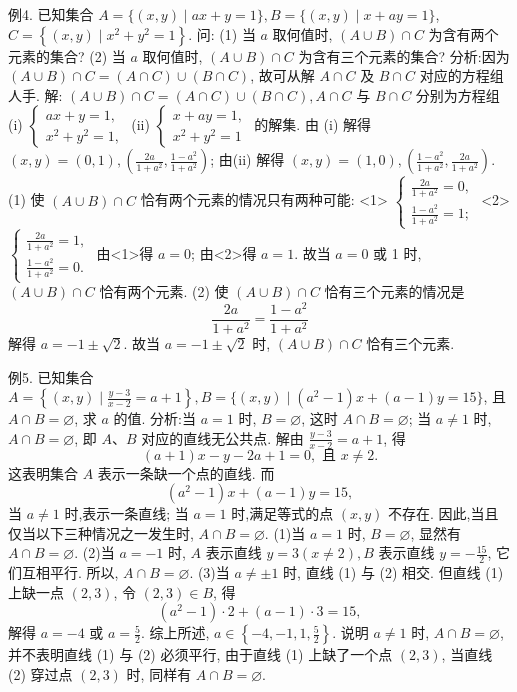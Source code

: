 例4. 已知集合 $A=\{(x, y) \mid a x+y=1\}, B=\{(x, y) \mid x+a y=1\}$, $C=\left\{(x, y) \mid x^2+y^2=1\right\}$. 问:
(1) 当 $a$ 取何值时, $(A \cup B) \cap C$ 为含有两个元素的集合?
(2) 当 $a$ 取何值时, $(A \cup B) \cap C$ 为含有三个元素的集合?
分析:因为 $(A \cup B) \cap C=(A \cap C) \cup(B \cap C)$, 故可从解 $A \cap C$ 及 $B \cap C$ 对应的方程组人手.
解: $(A \cup B) \cap C=(A \cap C) \cup(B \cap C), A \cap C$ 与 $B \cap C$ 分别为方程组
(i) $\left\{\begin{array}{l}a x+y=1, \\ x^2+y^2=1,\end{array}\right.$
(ii) $\left\{\begin{array}{l}x+a y=1, \\ x^2+y^2=1\end{array}\right.$
的解集.
由 (i) 解得 $(x, y)=(0,1),\left(\frac{2 a}{1+a^2}, \frac{1-a^2}{1+a^2}\right)$;
由(ii) 解得 $(x, y)=(1,0),\left(\frac{1-a^2}{1+a^2}, \frac{2 a}{1+a^2}\right)$.
(1) 使 $(A \cup B) \cap C$ 恰有两个元素的情况只有两种可能:
<1> $\left\{\begin{array}{l}\frac{2 a}{1+a^2}=0, \\ \frac{1-a^2}{1+a^2}=1 ;\end{array}\right.$
<2> $\left\{\begin{array}{l}\frac{2 a}{1+a^2}=1, \\ \frac{1-a^2}{1+a^2}=0 .\end{array}\right.$
由<1>得 $a=0$; 由<2>得 $a=1$.
故当 $a=0$ 或 1 时, $(A \cup B) \cap C$ 恰有两个元素.
(2) 使 $(A \cup B) \cap C$ 恰有三个元素的情况是
$$
\frac{2 a}{1+a^2}=\frac{1-a^2}{1+a^2}
$$
解得 $a=-1 \pm \sqrt{2}$.
故当 $a=-1 \pm \sqrt{2}$ 时, $(A \cup B) \cap C$ 恰有三个元素.



例5. 已知集合 $A=\left\{(x, y) \mid \frac{y-3}{x-2}=a+1\right\}, B=\{(x, y) \mid(a^2- 1) x+(a-1) y=15\}$, 且 $A \cap B=\varnothing$, 求 $a$ 的值.
分析:当 $a=1$ 时, $B=\varnothing$, 这时 $A \cap B=\varnothing$; 当 $a \neq 1$ 时, $A \cap B=\varnothing$, 即 $A 、 B$ 对应的直线无公共点.
解由 $\frac{y-3}{x-2}=a+1$, 得
$$
(a+1) x-y-2 a+1=0, \text { 且 } x \neq 2 .
$$
这表明集合 $A$ 表示一条缺一个点的直线.
而
$$
\left(a^2-1\right) x+(a-1) y=15,
$$
当 $a \neq 1$ 时,表示一条直线; 当 $a=1$ 时,满足等式的点 $(x, y)$ 不存在.
因此,当且仅当以下三种情况之一发生时, $A \cap B=\varnothing$.
(1)当 $a=1$ 时, $B=\varnothing$, 显然有 $A \cap B=\varnothing$.
(2)当 $a=-1$ 时, $A$ 表示直线 $y=3(x \neq 2), B$ 表示直线 $y=-\frac{15}{2}$, 它们互相平行.
所以, $A \cap B=\varnothing$.
(3)当 $a \neq \pm 1$ 时, 直线 (1) 与 (2) 相交.
但直线 (1) 上缺一点 $(2,3)$, 令 $(2, 3) \in B$, 得
$$
\left(a^2-1\right) \cdot 2+(a-1) \cdot 3=15,
$$
解得 $a=-4$ 或 $a=\frac{5}{2}$.
综上所述, $a \in\left\{-4,-1,1, \frac{5}{2}\right\}$.
说明 $a \neq 1$ 时, $A \cap B=\varnothing$, 并不表明直线 (1) 与 (2) 必须平行, 由于直线 (1) 上缺了一个点 $(2,3)$, 当直线 (2) 穿过点 $(2,3)$ 时, 同样有 $A \cap B=\varnothing$.



